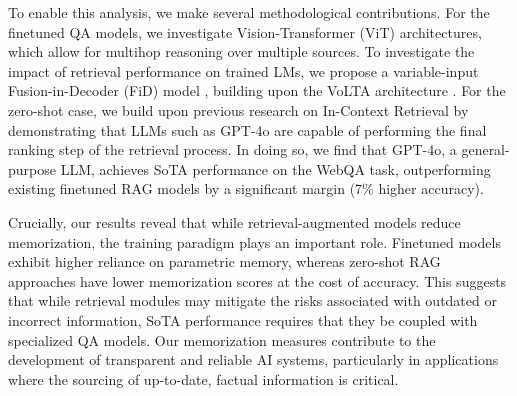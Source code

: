 To enable this analysis, we make several methodological contributions. For the finetuned QA models, we investigate Vision-Transformer (ViT) architectures, which allow for multihop reasoning over multiple sources. To investigate the impact of retrieval performance on trained LMs, we propose a variable-input Fusion-in-Decoder (FiD) model \cite{tanaka_slidevqa_2023, nlvr2}, building upon the VoLTA architecture \citep{pramanick_volta_2023}. For the zero-shot case, we build upon previous research on In-Context Retrieval \citep{incontext_rag} by demonstrating that LLMs such as GPT-4o are capable of performing the final ranking step of the retrieval process. In doing so, we find that GPT-4o, a general-purpose LLM, achieves SoTA performance on the WebQA task, outperforming existing finetuned RAG models by a significant margin (7\% higher accuracy). 

Crucially, our results reveal that while retrieval-augmented models reduce memorization, the training paradigm plays an important role. Finetuned models exhibit higher reliance on parametric memory, whereas zero-shot RAG approaches have lower memorization scores at the cost of accuracy. This suggests that while retrieval modules may mitigate the risks associated with outdated or incorrect information, SoTA performance requires that they be coupled with specialized QA models. Our memorization measures contribute to the development of transparent and reliable AI systems, particularly in applications where the sourcing of up-to-date, factual information is critical.





